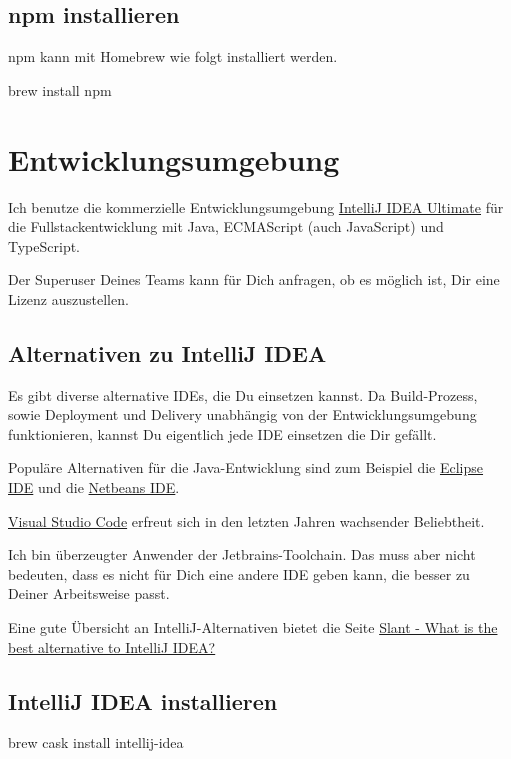 \documentclass[]{article}
\begin{document}
\subsection{npm installieren}
npm kann mit Homebrew wie folgt installiert werden.
\begin{bashcode}
brew install npm
\end{bashcode}

\section{Entwicklungsumgebung}
Ich benutze die kommerzielle Entwicklungsumgebung \href{https://www.jetbrains.com/idea/}{IntelliJ IDEA Ultimate} für die Fullstackentwicklung mit Java, ECMAScript (auch JavaScript) und TypeScript. 

Der Superuser Deines Teams kann für Dich anfragen, ob es möglich ist, Dir eine Lizenz auszustellen.

\subsection{Alternativen zu IntelliJ IDEA}
Es gibt diverse alternative IDEs, die Du einsetzen kannst. Da Build-Prozess, sowie Deployment und Delivery unabhängig von der Entwicklungsumgebung funktionieren, kannst Du eigentlich jede IDE einsetzen die Dir gefällt.

Populäre Alternativen für die Java-Entwicklung sind zum Beispiel die \href{https://www.eclipse.org/ide/}{Eclipse IDE} und die \href{https://netbeans.org/}{Netbeans IDE}.

\href{https://code.visualstudio.com/}{Visual Studio Code} erfreut sich in den letzten Jahren wachsender Beliebtheit.

Ich bin überzeugter Anwender der Jetbrains-Toolchain. Das muss aber nicht bedeuten, dass es nicht für Dich eine andere IDE geben kann, die besser zu Deiner Arbeitsweise passt.

Eine gute Übersicht an IntelliJ-Alternativen bietet die Seite \href{https://www.slant.co/options/1958/alternatives/~intellij-idea-alternatives}{Slant - What is the best alternative to IntelliJ IDEA?}

\subsection{IntelliJ IDEA installieren}
\begin{bashcode}
brew cask install intellij-idea
\end{bashcode}
\end{document}
